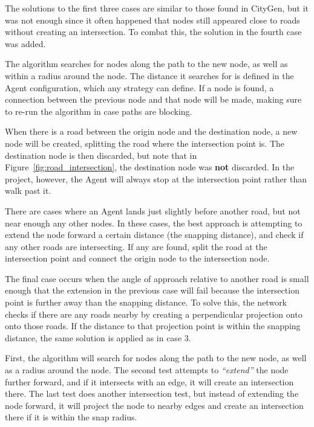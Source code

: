 The solutions to the first three cases are similar to those found in CityGen, but it was not enough since it often happened that nodes still appeared close to roads without creating an intersection. %
To combat this, the solution in the fourth case was added.
\begin{CaseEnum}
  \item The algorithm searches for nodes along the path to the new node, as well as within a radius around the node.
  The distance it searches for is defined in the Agent configuration, which any strategy can define.
  If a node is found, a connection between the previous node and that node will be made, making sure to re-run the algorithm in case paths are blocking.

  \item When there is a road between the origin node and the destination node, a new node will be created, splitting the road where the intersection point is.
  The destination node is then discarded, but note that in Figure~\ref{fig:road_intersection}, the destination node was \textbf{not} discarded.
  In the project, however, the Agent will always stop at the intersection point rather than walk past it.

  \item There are cases where an Agent lands just slightly before another road, but not near enough any other nodes.
  In these cases, the best approach is attempting to extend the node forward a certain distance (the snapping distance), and check if any other roads are intersecting.
  If any are found, split the road at the intersection point and connect the origin node to the intersection node.

  \item The final case occurs when the angle of approach relative to another road is small enough that the extension in the previous case will fail because the intersection point is further away than the snapping distance.
  To solve this, the network checks if there are any roads nearby by creating a perpendicular projection onto onto those roads.
  If the distance to that projection point is within the snapping distance, the same solution is applied as in case 3.
\end{CaseEnum}

First, the algorithm will search for nodes along the path to the new node, as well as a radius around the node.
The second test attempts to \textit{``extend''} the node further forward, and if it intersects with an edge, it will create an intersection there.
The last test does another intersection test, but instead of extending the node forward, it will project the node to nearby edges and create an intersection there if it is within the snap radius.


